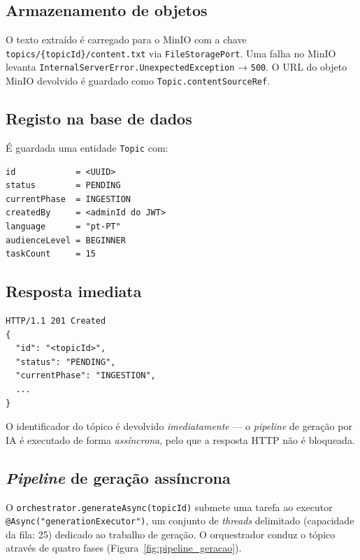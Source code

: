 \subsection*{Armazenamento de objetos}

O texto extraído é carregado para o MinIO com a chave
\texttt{topics/\{topicId\}/content.txt} via \texttt{FileStoragePort}.
Uma falha no MinIO levanta \texttt{InternalServerError.UnexpectedException}
→ \texttt{500}.
O URL do objeto MinIO devolvido é guardado como \texttt{Topic.contentSourceRef}.

\subsection*{Registo na base de dados}

É guardada uma entidade \texttt{Topic} com:

\begin{verbatim}
id            = <UUID>
status        = PENDING
currentPhase  = INGESTION
createdBy     = <adminId do JWT>
language      = "pt-PT"
audienceLevel = BEGINNER
taskCount     = 15
\end{verbatim}

\subsection*{Resposta imediata}

\begin{verbatim}
HTTP/1.1 201 Created
{
  "id": "<topicId>",
  "status": "PENDING",
  "currentPhase": "INGESTION",
  ...
}
\end{verbatim}

O identificador do tópico é devolvido \emph{imediatamente} — o
\textit{pipeline} de geração por IA é executado de forma \emph{assíncrona},
pelo que a resposta HTTP não é bloqueada.

\subsection*{\textit{Pipeline} de geração assíncrona}

O \texttt{orchestrator.generateAsync(topicId)} submete uma tarefa ao
executor \texttt{@Async("generationExecutor")}, um conjunto de
\textit{threads} delimitado (capacidade da fila: 25) dedicado ao trabalho
de geração.
O orquestrador conduz o tópico através de quatro fases
(Figura~\ref{fig:pipeline_geracao}).

